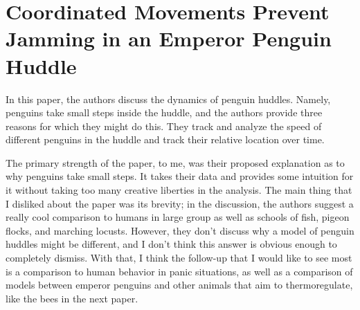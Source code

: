 \documentclass[12pt]{article}
\begin{document}

\section*{Coordinated Movements Prevent Jamming in an Emperor Penguin Huddle}
In this paper, the authors discuss the dynamics of penguin huddles.
Namely, penguins take small steps inside the huddle, and the authors provide three reasons for which they might do this.
They track and analyze the speed of different penguins in the huddle and track their relative location over time.

The primary strength of the paper, to me, was their proposed explanation as to why penguins take small steps.
It takes their data and provides some intuition for it without taking too many creative liberties in the analysis.
The main thing that I disliked about the paper was its brevity; in the discussion, the authors suggest a really cool comparison to humans in large group as well as schools of fish, pigeon flocks, and marching locusts.
However, they don't discuss why a model of penguin huddles might be different, and I don't think this answer is obvious enough to completely dismiss.
With that, I think the follow-up that I would like to see most is a comparison to human behavior in panic situations, as well as a comparison of models between emperor penguins and other animals that aim to thermoregulate, like the bees in the next paper.
\end{document}
